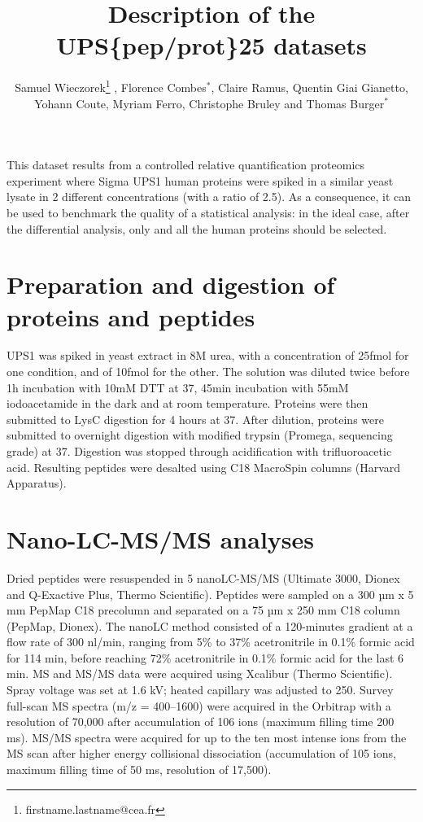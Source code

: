 \documentclass[12pt,a4paper]{article}
\begin{document}

\title{Description of the UPS\{pep/prot\}25 datasets}
\author{
Samuel Wieczorek\footnote{firstname.lastname@cea.fr} ,
Florence Combes$^\ast$,
Claire Ramus,
Quentin Giai Gianetto,\\
Yohann Coute,
Myriam Ferro,
Christophe Bruley
and Thomas Burger$^\ast$
}
\maketitle





This dataset results from a controlled relative quantification proteomics experiment where Sigma UPS1 human proteins were spiked in a similar yeast lysate in 2 different concentrations (with a ratio of 2.5).
As a consequence, it can be used to benchmark the quality of a statistical analysis: in the ideal case, after the differential analysis, only and all the human proteins should be selected.

\section{Preparation and digestion of proteins and peptides}
UPS1 was spiked in yeast extract in 8M urea, with a concentration of 25fmol 
for one condition, and of 10fmol for the other. The solution was diluted twice 
before 1h incubation with 10mM DTT at 37\celsius, 45min incubation with 55mM 
iodoacetamide in the dark and at room temperature. Proteins were then 
submitted to LysC digestion for 4 hours at 37\celsius. After dilution, proteins were 
submitted to overnight digestion with modified trypsin (Promega, sequencing 
grade) at 37\celsius. Digestion was stopped through acidification with
trifluoroacetic acid. Resulting peptides were desalted using C18 MacroSpin
columns (Harvard Apparatus).

\section{Nano-LC-MS/MS analyses}
Dried peptides were resuspended in 5%
nanoLC-MS/MS (Ultimate 3000, Dionex and Q-Exactive Plus, Thermo Scientific).
Peptides were sampled on a 300 µm x 5 mm PepMap C18 precolumn and separated
on a 75 µm x 250 mm C18 column (PepMap, Dionex). The nanoLC method consisted
of a 120-minutes gradient at a flow rate of 300 nl/min, ranging from 5\% to 37\%
acetronitrile in 0.1\% formic acid for 114 min, before reaching 72\%
acetronitrile in 0.1\% formic acid for the last 6 min. MS and MS/MS data were
acquired using Xcalibur (Thermo Scientific). Spray voltage was set at 1.6 kV;
heated capillary was adjusted to 250\celsius. Survey full-scan MS spectra
(m/z = 400–1600) were acquired in the Orbitrap with a resolution of 70,000
after accumulation of 106 ions (maximum filling time 200 ms). MS/MS spectra
were acquired for up to the ten most intense ions from the MS scan after
higher energy collisional dissociation (accumulation of 105 ions, maximum
filling time of 50 ms, resolution of 17,500).
\end{document}
